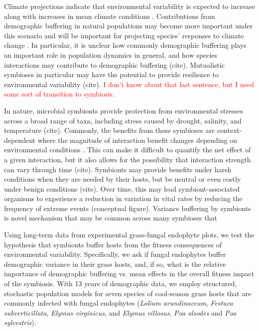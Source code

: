 \documentclass[9pt,twocolumn,twoside,lineno]{pnas-new}
\begin{document}
Climate projections indicate that environmental variability is expected to increase along with increases in mean climate conditions \cite{IPCC2012managing,iles2019shifting}. Contributions from demographic buffering in natural populations may become more important under this scenario and will be important for projecting species' responses to climate change \cite{doak2005correctly}. In particular, it is unclear how commonly demographic buffering plays an important role in population dynamics in general, and how species interactions may contribute to demographic buffering (cite).  Mutualistic symbioses in particular may have the potential to provide resilience to environmental variability (cite). \textcolor{red}{I don't know about that last sentence, but I need some sort of transition to symbiosis.}

In nature, microbial symbionts provide protection from environmental stresses across a broad range of taxa, including stress caused by drought, salinity, and temperature (cite). Commonly, the benefits from these symbioses are context-dependent where the magnitude of interaction benefit changes depending on environmental conditions \cite{chamberlain2014context}. This can make it difficult to quantify the net effect of a given interaction, but it also allows for the possibility that interaction strength can vary through time (cite). Symbionts may provide benefits under harsh conditions when they are needed by their hosts, but be neutral or even costly under benign conditions (cite).  Over time, this may lead symbiont-associated organisms to experience a reduction in variation in vital rates by reducing the frequency of extreme events (conceptual figure). Variance buffering by symbionts is novel mechanism that may be common across many symbioses that

Using long-term data from experimental grass-fungal endophyte plots, we test the hypothesis that symbionts buffer hosts from the fitness consequences of environmental variability. Specifically, we ask if fungal endophytes buffer demographic variance in their grass hosts, and, if so, what is the relative importance of demographic buffering vs. mean effects in the overall fitness impact of the symbiosis.  With 13 years of demographic data, we employ structured, stochastic population models for seven species of cool-season grass hosts that are commonly infected with fungal endophytes (\textit{Lolium arundinaceum}, \textit{Festuca subverticillata}, \textit{Elymus virginicus}, and \textit{Elymus villosus}, \textit{Poa alsodes} and \textit{Poa sylvestris}).
\end{document}
